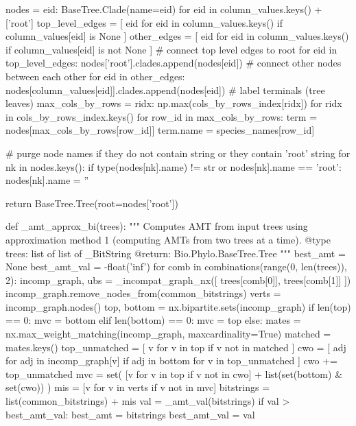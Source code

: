 \documentclass[a4paper, 12pt]{book}
\begin{document}
\begin{python}
    nodes = {
      eid: BaseTree.Clade(name=eid) 
      for eid in column_values.keys() + ['root']
    }
    top_level_edges = [
      eid for eid in column_values.keys() 
      if column_values[eid] is None
    ]
    other_edges = [
      eid for eid in column_values.keys() 
      if column_values[eid] is not None
    ]
    # connect top level edges to root
    for eid in top_level_edges:
      nodes['root'].clades.append(nodes[eid])
    # connect other nodes between each other
    for eid in other_edges:
      nodes[column_values[eid]].clades.append(nodes[eid])
    # label terminals (tree leaves)
    max_cols_by_rows = {
      ridx: np.max(cols_by_rows_index[ridx]) 
      for ridx in cols_by_rows_index.keys()
    }
    for row_id in max_cols_by_rows:
      term = nodes[max_cols_by_rows[row_id]]
      term.name = species_names[row_id]

    # purge node names if they do not contain string or they contain 'root' string
    for nk in nodes.keys():
      if type(nodes[nk].name) != str or nodes[nk].name == 'root':
        nodes[nk].name = ''

    return BaseTree.Tree(root=nodes['root'])

  def _amt_approx_bi(trees):
    """
    Computes AMT from input trees using approximation 
    method 1 (computing AMTs from two trees at a time).
    @type trees:  list of list of _BitString
    @return: Bio.Phylo.BaseTree.Tree
    """
    best_amt = None
    best_amt_val = -float('inf')
    for comb in combinations(range(0, len(trees)), 2):
      incomp_graph, ubs = _incompat_graph_nx([
        trees[comb[0]], trees[comb[1]]
      ])
      incomp_graph.remove_nodes_from(common_bitstrings)
      verts = incomp_graph.nodes()
      top, bottom = nx.bipartite.sets(incomp_graph)
      if len(top) == 0:
        mvc = bottom
      elif len(bottom) == 0:
        mvc = top
      else:
        mates = nx.max_weight_matching(incomp_graph, maxcardinality=True)
        matched = mates.keys()
        top_unmatched = [
          v for v in top 
          if v not in matched
        ]
        cwo = [
          adj for adj in incomp_graph[v] 
          if adj in bottom 
          for v in top_unmatched
        ]
        cwo += top_unmatched
        mvc = set(
          [v for v in top if v not in cwo] 
          + list(set(bottom) & set(cwo))
        )
      mis = [v for v in verts if v not in mvc]
      bitstrings = list(common_bitstrings) + mis
      val = _amt_val(bitstrings)
      if val > best_amt_val:
        best_amt = bitstrings
        best_amt_val = val


\end{python}
\end{document}
